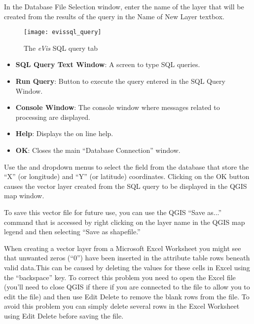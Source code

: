 In the Database File Selection window, enter the name of the layer that will be created from the
results of the query in the Name of New Layer textbox.

\begin{figure}[ht]
   \centering
   \texttt{[image: evissql\_query]}
   \caption{The \emph{eVis} SQL query tab \wincaption}\label{evissql_query}
\end{figure}

\begin{itemize}[label=--]
\item \textbf{SQL Query Text Window}: A screen to type SQL queries.
\item \textbf{Run Query}: Button to execute the query entered in the SQL Query Window.
\item \textbf{Console Window}: The console window where messages related to processing are
displayed.
\item \textbf{Help}: Displays the on line help.
\item \textbf{OK}: Closes the main ``Database Connection'' window.
\end{itemize}

Use the  and  dropdown menus to select the field
from the database that store the ``X'' (or longitude) and ``Y'' (or latitude) coordinates. Clicking
on the OK button causes the vector layer created from the SQL query to be displayed in the QGIS map
window.

To save this vector file for future use, you can use the QGIS ``Save as...'' command that is
accessed by right clicking on the layer name in the QGIS map legend and then selecting ``Save as
shapefile.''

\begin{Tip}\caption{\textsc{Creating a vector layer from a Microsoft Excel Worksheet}}
When creating a vector layer from a Microsoft Excel Worksheet you might see that unwanted
zeros (``0'') have been inserted in the attribute table rows beneath valid data.This can be caused
by deleting the values for these cells in Excel using the ``backspace'' key. To correct this problem
you need to open the Excel file (you'll need to close QGIS if there if you are connected to the file
to allow you to edit the file) and then use Edit \arrow Delete to remove the blank rows from the file. To
avoid this problem you can simply delete several rows in the Excel Worksheet using Edit \arrow Delete
before saving the file.
\end{Tip}

